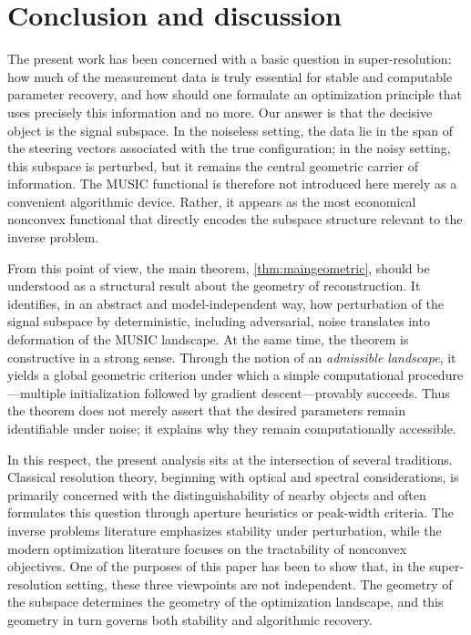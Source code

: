 \documentclass[11pt]{article}
\theoremstyle{definition}
\numberwithin{theorem}{section}
\numberwithin{lemma}{section}
\numberwithin{equation}{section}
\numberwithin{equation}{section}
\begin{document}
	
\section{Conclusion and discussion}
\label{sec:conclusion}

The present work has been concerned with a basic question in super-resolution: how much of the measurement data is truly essential for stable and computable parameter recovery, and how should one formulate an optimization principle that uses precisely this information and no more. Our answer is that the decisive object is the signal subspace. In the noiseless setting, the data lie in the span of the steering vectors associated with the true configuration; in the noisy setting, this subspace is perturbed, but it remains the central geometric carrier of information. The MUSIC functional is therefore not introduced here merely as a convenient algorithmic device. Rather, it appears as the most economical nonconvex functional that directly encodes the subspace structure relevant to the inverse problem.

From this point of view, the main theorem, \cref{thm:maingeometric}, should be understood as a structural result about the geometry of reconstruction. It identifies, in an abstract and model-independent way, how perturbation of the signal subspace by deterministic, including adversarial, noise translates into deformation of the MUSIC landscape. At the same time, the theorem is constructive in a strong sense. Through the notion of an \emph{admissible landscape}, it yields a global geometric criterion under which a simple computational procedure---multiple initialization followed by gradient descent---provably succeeds. Thus the theorem does not merely assert that the desired parameters remain identifiable under noise; it explains why they remain computationally accessible.

In this respect, the present analysis sits at the intersection of several traditions. Classical resolution theory, beginning with optical and spectral considerations, is primarily concerned with the distinguishability of nearby objects and often formulates this question through aperture heuristics or peak-width criteria. The inverse problems literature emphasizes stability under perturbation, while the modern optimization literature focuses on the tractability of nonconvex objectives. One of the purposes of this paper has been to show that, in the super-resolution setting, these three viewpoints are not independent. The geometry of the subspace determines the geometry of the optimization landscape, and this geometry in turn governs both stability and algorithmic recovery.
\end{document}
